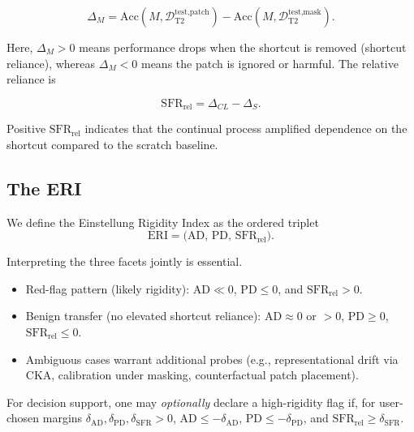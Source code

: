 \documentclass[conference]{IEEEtran}
\begin{document}
\begin{equation}
\Delta_M = \mathrm{Acc}\!\left(M,\mathcal{D}_{\mathrm{T2}}^{\text{test,patch}}\right) -\mathrm{Acc}\!\left(M,\mathcal{D}_{\mathrm{T2}}^{\text{test,mask}}\right).
\label{eq:delta}
\end{equation}

Here, \(\Delta_M>0\) means performance drops when the shortcut is removed (shortcut reliance), whereas \(\Delta_M<0\) means the patch is ignored or harmful. The relative reliance is

\begin{equation}
\mathrm{SFR}_{\mathrm{rel}} = \Delta_{CL}-\Delta_S.
\label{eq:sfr_rel}
\end{equation}

Positive \(\mathrm{SFR}_{\mathrm{rel}}\) indicates that the continual process amplified dependence on the shortcut compared to the scratch baseline.

\subsection{The ERI}
We define the Einstellung Rigidity Index as the ordered triplet
\begin{equation}
\mathrm{ERI} = \big(\mathrm{AD},\,\mathrm{PD},\,\mathrm{SFR}_{\mathrm{rel}}\big).
\label{eq:eri}
\end{equation}

Interpreting the three facets jointly is essential.

\begin{itemize}
 \item Red-flag pattern (likely rigidity): \(\mathrm{AD}\ll 0\),   \(\mathrm{PD}\le 0\), and \(\mathrm{SFR}_{\mathrm{rel}}>0\).
 \item Benign transfer (no elevated shortcut reliance):
    \(\mathrm{AD}\approx 0\) or \(>0\),
    \(\mathrm{PD}\ge 0\),
    \(\mathrm{SFR}_{\mathrm{rel}}\le 0\).
 \item Ambiguous cases warrant additional probes (e.g., representational drift via CKA, calibration under masking, counterfactual patch placement).
\end{itemize}

For decision support, one may \emph{optionally} declare a high-rigidity flag if, for user-chosen margins \(\delta_{\mathrm{AD}},\delta_{\mathrm{PD}},\delta_{\mathrm{SFR}}>0\), \(\mathrm{AD}\le -\delta_{\mathrm{AD}}\), \(\mathrm{PD}\le -\delta_{\mathrm{PD}}\), and \(\mathrm{SFR}_{\mathrm{rel}}\ge \delta_{\mathrm{SFR}}\).
\end{document}
